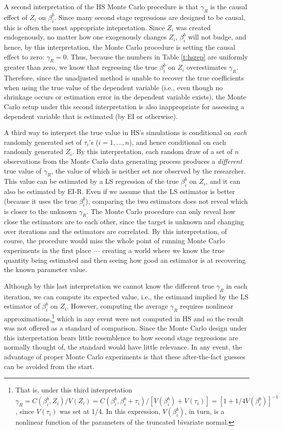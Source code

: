 \documentclass[11pt,titlepage]{article}
\begin{document}
A second interpretation of the HS Monte Carlo procedure is that
$\gamma_R$ is the causal effect of $Z_i$ on $\beta_i^b$.  Since many
second stage regressions are designed to be causal, this is often the
most appropriate intepretation.  Since $Z_i$ was created endogenously,
no matter how one exogenously changes $Z_i$, $\beta_i^b$ will not
budge, and hence, by this interpretation, the Monte Carlo procedure is
setting the causal effect to zero: $\gamma_R=0$.  Thus, because the
numbers in Table \ref{t:hsrep} are uniformly greater than zero, we
know that regressing the true $\beta_i^b$ on $Z_i$ overestimates
$\gamma_R$.  Therefore, since the unadjusted method is unable to
recover the true coefficients when using the true value of the
dependent variable (i.e., even though no shrinkage occurs or
estimation error in the dependent variable exists), the Monte Carlo
setup under this second interpretation is also inappropriate for
assessing a dependent variable that is estimated (by EI or otherwise).
  
A third way to interpret the true value in HS's simulations is
conditional on \emph{each} randomly generated set of $\tau_i$'s
($i=1,\dots,n$), and hence conditional on each randomly generated
$Z_i$.  By this interpretation, each random draw of a set of $n$
observations from the Monte Carlo data generating process produces a
\emph{different} true value of $\gamma_R$, the value of which is
neither set nor observed by the researcher.  This value can be
estimated by a LS regression of the true $\beta_i^b$ on $Z_i$, and it
can also be estimated by EI-R.  Even if we assume that the LS
estimator is better (because it uses the true $\beta_i^b$), comparing
the two estimators does not reveal which is closer to the unknown
$\gamma_R$.  The Monte Carlo procedure can only reveal how close the
estimators are to each other, since the target is unknown and changing
over iterations and the estimators are correlated.  By this
interpretation, of course, the procedure would miss the whole point of
running Monte Carlo experiments in the first place --- creating a
world where we know the true quantity being estimated and then seeing
how good an estimator is at recovering the known parameter value.
  
Although by this last interpretation we cannot know the different true
$\gamma_R$ in each iteration, we can compute its expected value, i.e.,
the estimand implied by the LS estimator of $\beta_i^b$ on $Z_i$.
However, computing the average $\gamma_R$ requires nonlinear
approximations,\footnote{That is, under this third interpretation
  $\gamma_R=C(\beta_i^b,Z_i)/V(Z_i) =
  C(\beta_i^b,\beta_i^b+\tau_i)/[V(\beta_i^b)+V(\tau_i)] =
  [1+1/4V(\beta_i^b)]^{-1}$, since $V(\tau_i)$ was set at 1/4.  In
  this expression, $V(\beta_i^b)$, in turn, is a nonlinear function of
  the parameters of the truncated bivariate normal.} which in any
event were not computed in HS and so the result was not offered as a
standard of comparison.  Since the Monte Carlo design under this
interpretation bears little resemblence to how second stage
regressions are normally thought of, the standard would have little
relevance.  In any event, the advantage of proper Monte Carlo
experiments is that these after-the-fact guesses can be avoided from
the start.
\end{document}
